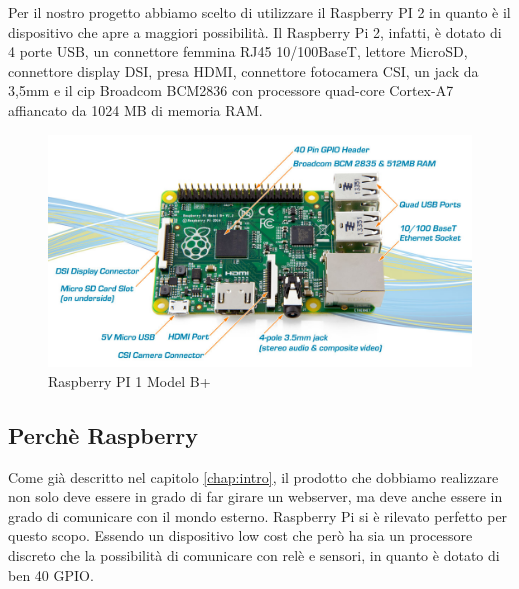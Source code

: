 Per il nostro progetto abbiamo scelto di utilizzare il Raspberry PI 2 in
quanto è il dispositivo che apre a maggiori possibilità. Il Raspberry Pi 2,
infatti, è dotato di 4 porte USB, un connettore femmina RJ45
10/100BaseT, lettore MicroSD, connettore display DSI, presa HDMI,
connettore fotocamera CSI, un jack da 3,5mm e il cip Broadcom
BCM2836 con processore quad-core Cortex-A7 affiancato da 1024 MB di
memoria RAM.
\begin{figure}[h]
\centering
\includegraphics[scale=0.3]{Immagini/raspberry.png}
\caption{Raspberry PI 1 Model B+}
\end{figure}

\subsection{Perchè Raspberry}

Come già descritto nel capitolo \ref{chap:intro}, il prodotto che dobbiamo realizzare non solo deve essere in grado di far girare un webserver, ma deve anche essere in grado di comunicare con il mondo esterno. Raspberry Pi si è rilevato perfetto per questo scopo.
Essendo un dispositivo low cost che però ha sia un processore discreto che la possibilità di comunicare con relè e sensori, in quanto è dotato di ben 40 GPIO.